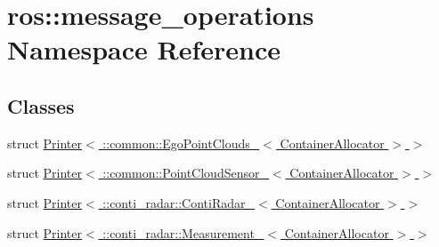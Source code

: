 \hypertarget{namespaceros_1_1message__operations}{}\section{ros\+:\+:message\+\_\+operations Namespace Reference}
\label{namespaceros_1_1message__operations}
\subsection*{Classes}
\begin{DoxyCompactItemize}
\item 
struct \hyperlink{structros_1_1message__operations_1_1Printer_3_01_1_1common_1_1EgoPointClouds___3_01ContainerAllocator_01_4_01_4}{Printer$<$ \+::common\+::\+Ego\+Point\+Clouds\+\_\+$<$ Container\+Allocator $>$ $>$}
\item 
struct \hyperlink{structros_1_1message__operations_1_1Printer_3_01_1_1common_1_1PointCloudSensor___3_01ContainerAllocator_01_4_01_4}{Printer$<$ \+::common\+::\+Point\+Cloud\+Sensor\+\_\+$<$ Container\+Allocator $>$ $>$}
\item 
struct \hyperlink{structros_1_1message__operations_1_1Printer_3_01_1_1conti__radar_1_1ContiRadar___3_01ContainerAllocator_01_4_01_4}{Printer$<$ \+::conti\+\_\+radar\+::\+Conti\+Radar\+\_\+$<$ Container\+Allocator $>$ $>$}
\item 
struct \hyperlink{structros_1_1message__operations_1_1Printer_3_01_1_1conti__radar_1_1Measurement___3_01ContainerAllocator_01_4_01_4}{Printer$<$ \+::conti\+\_\+radar\+::\+Measurement\+\_\+$<$ Container\+Allocator $>$ $>$}
\end{DoxyCompactItemize}
